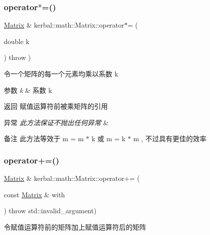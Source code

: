 \subsubsection{\texorpdfstring{operator$\ast$=()}{operator*=()}}
{\footnotesize\ttfamily \hyperlink{classkerbal_1_1math_1_1_matrix}{Matrix} \& kerbal\+::math\+::\+Matrix\+::operator$\ast$= (\begin{DoxyParamCaption}\item[{double}]{k }\end{DoxyParamCaption}) throw  ) }



令一个矩阵的每一个元素均乘以系数 k 


\begin{DoxyParams}{参数}
{\em k} & 系数 k \\
\hline
\end{DoxyParams}
\begin{DoxyReturn}{返回}
赋值运算符前被乘矩阵的引用 
\end{DoxyReturn}

\begin{DoxyExceptions}{异常}
{\em 此方法保证不抛出任何异常} & \\
\hline
\end{DoxyExceptions}
\begin{DoxyRemark}{备注}
此方法等效于 m = m $\ast$ k 或 m = k $\ast$ m , 不过具有更佳的效率 
\end{DoxyRemark}
\mbox{\label{classkerbal_1_1math_1_1_matrix_a2adadd6868dbd09192a77655dc54a580}} 
\subsubsection{\texorpdfstring{operator+=()}{operator+=()}}
{\footnotesize\ttfamily \hyperlink{classkerbal_1_1math_1_1_matrix}{Matrix} \& kerbal\+::math\+::\+Matrix\+::operator+= (\begin{DoxyParamCaption}\item[{const \hyperlink{classkerbal_1_1math_1_1_matrix}{Matrix} \&}]{with }\end{DoxyParamCaption}) throw  std\+::invalid\+\_\+argument) }



令赋值运算符前的矩阵加上赋值运算符后的矩阵 


